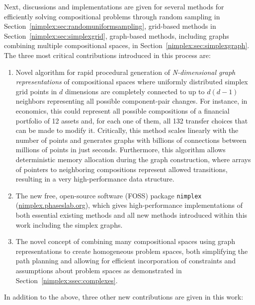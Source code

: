 Next, discussions and implementations are given for several methods for efficiently solving compositional problems through random sampling in Section~\ref{nimplex:sec:randomuniformsampling}, grid-based methods in Section~\ref{nimplex:sec:simplexgrid}, graph-based methods, including graphs combining multiple compositional spaces, in Section~\ref{nimplex:sec:simplexgraph}. The three most critical contributions introduced in this process are:

\begin{enumerate}
    \item Novel algorithm for rapid procedural generation of \emph{N-dimensional graph representations} of compositional spaces where uniformly distributed simplex grid points in $d$ dimensions are completely connected to up to $d(d-1)$ neighbors representing all possible component-pair changes. For instance, in economics, this could represent all possible compositions of a financial portfolio of 12 assets and, for each one of them, all 132 transfer choices that can be made to modify it. Critically, this method scales linearly with the number of points and generates graphs with billions of connections between millions of points in just seconds. Furthermore, this algorithm allows deterministic memory allocation during the graph construction, where arrays of pointers to neighboring compositions represent allowed transitions, resulting in a very high-performance data structure.
    
    \item The new free, open-source software (FOSS) package \texttt{nimplex} (\href{https://nimplex.phaseslab.org}{nimplex.phaseslab.org}), which gives high-performance implementations of both essential existing methods and all new methods introduced within this work including the simplex graphs.
    
    \item The novel concept of combining many compositional spaces using graph representations to create homogeneous problem spaces, both simplifying the path planning and allowing for efficient incorporation of constraints and assumptions about problem spaces as demonstrated in Section~\ref{nimplex:ssec:complexes}. 
    
\end{enumerate}

In addition to the above, three other new contributions are given in this work:

